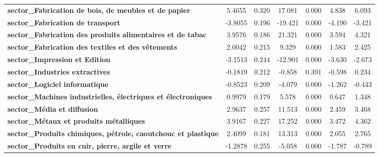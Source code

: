 \begin{center}
\begin{tabular}{lcccccc}
\textbf{sector\_Fabrication de bois, de meubles et de papier}         &       5.4655  &        0.320     &    17.081  &         0.000        &        4.838    &        6.093     \\
\textbf{sector\_Fabrication de transport}                             &      -3.8055  &        0.196     &   -19.421  &         0.000        &       -4.190    &       -3.421     \\
\textbf{sector\_Fabrication des produits alimentaires et de tabac}    &       3.9576  &        0.186     &    21.321  &         0.000        &        3.594    &        4.321     \\
\textbf{sector\_Fabrication des textiles et des vêtements}            &       2.0042  &        0.215     &     9.329  &         0.000        &        1.583    &        2.425     \\
\textbf{sector\_Impression et Edition}                                &      -3.1513  &        0.244     &   -12.901  &         0.000        &       -3.630    &       -2.673     \\
\textbf{sector\_Industries extractives}                               &      -0.1819  &        0.212     &    -0.858  &         0.391        &       -0.598    &        0.234     \\
\textbf{sector\_Logiciel informatique}                                &      -0.8523  &        0.209     &    -4.079  &         0.000        &       -1.262    &       -0.443     \\
\textbf{sector\_Machines industrielles, électriques et électroniques} &       0.9979  &        0.179     &     5.578  &         0.000        &        0.647    &        1.348     \\
\textbf{sector\_Média et diffusion}                                   &       2.9637  &        0.257     &    11.513  &         0.000        &        2.459    &        3.468     \\
\textbf{sector\_Métaux et produits métalliques}                       &       3.9167  &        0.227     &    17.252  &         0.000        &        3.472    &        4.362     \\
\textbf{sector\_Produits chimiques, pétrole, caoutchouc et plastique} &       2.4099  &        0.181     &    13.313  &         0.000        &        2.055    &        2.765     \\
\textbf{sector\_Produits en cuir, pierre, argile et verre}            &      -1.2878  &        0.255     &    -5.058  &         0.000        &       -1.787    &       -0.789     \\

\end{tabular}
\end{center}
